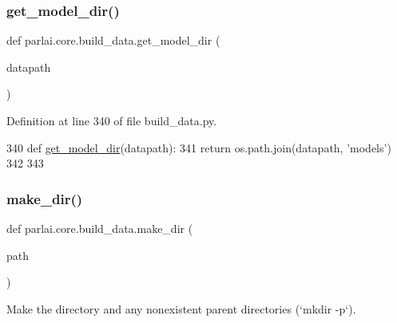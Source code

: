 \mbox{\label{namespaceparlai_1_1core_1_1build__data_ad2fe6222094caae59f304931aee0952a}} 
\subsubsection{\texorpdfstring{get\+\_\+model\+\_\+dir()}{get\_model\_dir()}}
{\footnotesize\ttfamily def parlai.\+core.\+build\+\_\+data.\+get\+\_\+model\+\_\+dir (\begin{DoxyParamCaption}\item[{}]{datapath }\end{DoxyParamCaption})}



Definition at line 340 of file build\+\_\+data.\+py.


\begin{DoxyCode}
340 \textcolor{keyword}{def }\hyperlink{namespaceparlai_1_1core_1_1build__data_ad2fe6222094caae59f304931aee0952a}{get\_model\_dir}(datapath):
341     \textcolor{keywordflow}{return} os.path.join(datapath, \textcolor{stringliteral}{'models'})
342 
343 
\end{DoxyCode}
\mbox{\label{namespaceparlai_1_1core_1_1build__data_a6ce042fedd4194bd016845bbe7a8facf}} 
\subsubsection{\texorpdfstring{make\+\_\+dir()}{make\_dir()}}
{\footnotesize\ttfamily def parlai.\+core.\+build\+\_\+data.\+make\+\_\+dir (\begin{DoxyParamCaption}\item[{}]{path }\end{DoxyParamCaption})}

\begin{DoxyVerb}Make the directory and any nonexistent parent directories (`mkdir -p`).
\end{DoxyVerb}
 

